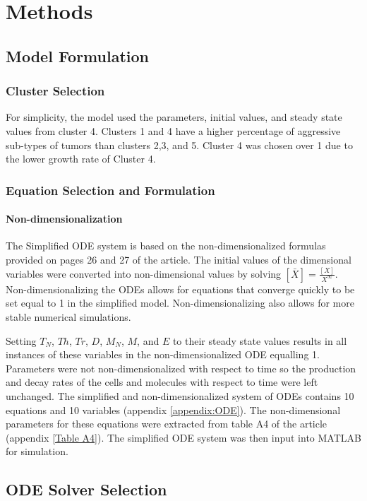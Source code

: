 \documentclass{article}
\begin{document}
\section{Methods}
\subsection{Model Formulation}
\subsubsection{Cluster Selection}
For simplicity, the model used the parameters, initial values, and steady state values from cluster 4. Clusters 1 and 4 have a higher percentage of aggressive sub-types of tumors than clusters 2,3, and 5. Cluster 4 was chosen over 1 due to the lower growth rate of Cluster 4. 
\subsubsection{Equation Selection and Formulation}
\paragraph{Non-dimensionalization}
The Simplified ODE system is based on the non-dimensionalized formulas provided on pages 26 and 27 of the article. The initial values of the dimensional variables were converted into non-dimensional values by solving $\left[\bar{X}\right] = \frac{\left[X\right]}{X^{\infty}} $. Non-dimensionalizing the ODEs allows for equations that converge quickly to be set equal to 1 in the simplified model. Non-dimensionalizing also allows for more stable numerical simulations. 

Setting $T_N$, $Th$, $Tr$, $D$, $M_N$, $M$, and $E$ to their steady state values results in all instances of these variables in the non-dimensionalized ODE equalling 1. Parameters were not non-dimensionalized with respect to time so the production and decay rates of the cells and molecules with respect to time were left unchanged. The simplified and non-dimensionalized system of ODEs contains 10 equations and 10 variables (appendix \ref{appendix:ODE}). The non-dimensional parameters for these equations were extracted from table A4 of the article (appendix \ref{Table A4}). The simplified ODE system was then input into MATLAB for simulation.

\subsection{ODE Solver Selection}
\end{document}
